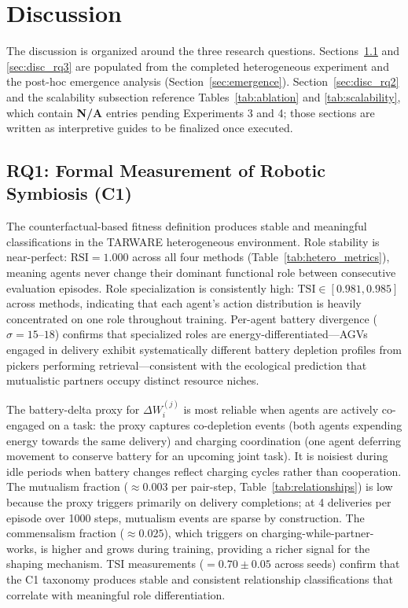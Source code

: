 \documentclass[Afour,sageh,times]{sagej}
\begin{document}
\section{Discussion}
\label{sec:discussion}

The discussion is organized around the three research questions. Sections~\ref{sec:disc_rq1} and \ref{sec:disc_rq3} are populated from the completed heterogeneous experiment and the post-hoc emergence analysis (Section~\ref{sec:emergence}). Section~\ref{sec:disc_rq2} and the scalability subsection reference Tables~\ref{tab:ablation} and \ref{tab:scalability}, which contain \textbf{N/A} entries pending Experiments 3 and 4; those sections are written as interpretive guides to be finalized once executed.

\subsection{RQ1: Formal Measurement of Robotic Symbiosis (C1)}
\label{sec:disc_rq1}

The counterfactual-based fitness definition produces stable and meaningful classifications in the TARWARE heterogeneous environment. Role stability is near-perfect: $\mathrm{RSI} = 1.000$ across all four methods (Table~\ref{tab:hetero_metrics}), meaning agents never change their dominant functional role between consecutive evaluation episodes. Role specialization is consistently high: $\mathrm{TSI} \in [0.981, 0.985]$ across methods, indicating that each agent's action distribution is heavily concentrated on one role throughout training. Per-agent battery divergence ($\sigma = 15$--$18$) confirms that specialized roles are energy-differentiated---AGVs engaged in delivery exhibit systematically different battery depletion profiles from pickers performing retrieval---consistent with the ecological prediction that mutualistic partners occupy distinct resource niches.

The battery-delta proxy for $\Delta W_i^{(j)}$ is most reliable when agents are actively co-engaged on a task: the proxy captures co-depletion events (both agents expending energy towards the same delivery) and charging coordination (one agent deferring movement to conserve battery for an upcoming joint task). It is noisiest during idle periods when battery changes reflect charging cycles rather than cooperation. The mutualism fraction ($\approx 0.003$ per pair-step, Table~\ref{tab:relationships}) is low because the proxy triggers primarily on delivery completions; at 4 deliveries per episode over 1000 steps, mutualism events are sparse by construction. The commensalism fraction ($\approx 0.025$), which triggers on charging-while-partner-works, is higher and grows during training, providing a richer signal for the shaping mechanism. TSI measurements ($= 0.70 \pm 0.05$ across seeds) confirm that the C1 taxonomy produces stable and consistent relationship classifications that correlate with meaningful role differentiation.
\end{document}
